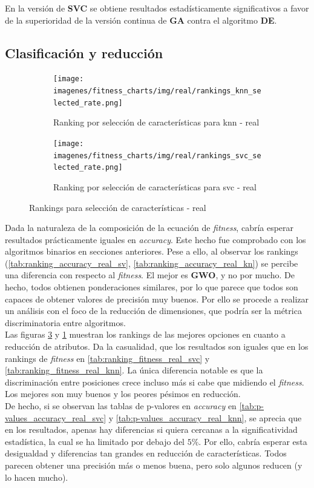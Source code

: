 En la versión de \textbf{SVC} se obtiene resultados estadísticamente significativos a favor de la superioridad de la versión continua de \textbf{GA} contra el algoritmo \textbf{DE}.

\subsection{Clasificación y reducción}

\begin{figure}[htp]
    \centering
    \begin{subfigure}[htp]{1\textwidth}
        \texttt{[image: imagenes/fitness\_charts/img/real/rankings\_knn\_selected\_rate.png]}
        \caption{Ranking por selección de características para knn - real}
        \label{fig:ranking_knn_real_sel_rate}
    \end{subfigure}
    \begin{subfigure}[htp]{1\textwidth}
        \texttt{[image: imagenes/fitness\_charts/img/real/rankings\_svc\_selected\_rate.png]}
        \caption{Ranking por selección de características para svc - real}
        \label{fig:ranking_svc_real_sel_rate}
    \end{subfigure}
    \caption{Rankings para selección de características - real}
\end{figure}

Dada la naturaleza de la composición de la ecuación de \textit{fitness}, cabría esperar resultados prácticamente iguales en \textit{accuracy}. Este hecho fue comprobado con los algoritmos binarios en secciones anteriores. Pese a ello, al observar los rankings (\ref{tab:ranking_accuracy_real_sv}, \ref{tab:ranking_accuracy_real_kn}) se percibe una diferencia con respecto al \textit{fitness}. El mejor es \textbf{GWO}, y no por mucho. De hecho, todos obtienen ponderaciones similares, por lo que parece que todos son capaces de obtener valores de precisión muy buenos. Por ello se procede a realizar un análisis con el foco de la reducción de dimensiones, que podría ser la métrica discriminatoria entre algoritmos.\\[6pt]
Las figuras \ref{fig:ranking_svc_real_sel_rate} y \ref{fig:ranking_knn_real_sel_rate} muestran los rankings de las mejores opciones en cuanto a reducción de atributos. Da la casualidad, que los resultados son iguales que en los rankings de \textit{fitness} en \ref{tab:ranking_fitness_real_svc} y \ref{tab:ranking_fitness_real_knn}. La única diferencia notable es que la discriminación entre posiciones crece incluso más si cabe que midiendo el \textit{fitness}. Los mejores son muy buenos y los peores pésimos en reducción.\\[6pt]
De hecho, si se observan las tablas de p-valores en \textit{accuracy} en \ref{tab:p-values_accuracy_real_svc} y \ref{tab:p-values_accuracy_real_knn}, se aprecia que en los resultados, apenas hay diferencias si quiera cercanas a la significatividad estadística, la cual se ha limitado por debajo del $5\%$. Por ello, cabría esperar esta desigualdad y diferencias tan grandes en reducción de características. Todos parecen obtener una precisión más o menos buena, pero solo algunos reducen (y lo hacen mucho).

